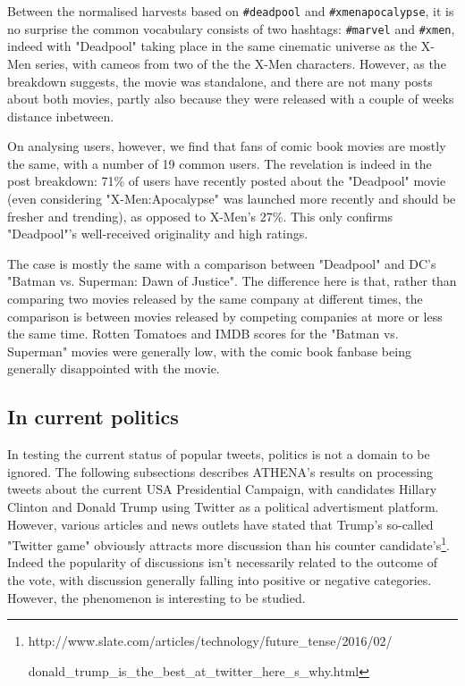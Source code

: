 \documentclass[12pt,a4paper,twoside]{report}
\begin{document}
Between the normalised harvests based on \texttt{\#deadpool} and \texttt{\#xmenapocalypse}, it is no surprise the common vocabulary consists of two hashtags: \texttt{\#marvel} and \texttt{\#xmen}, indeed with "Deadpool" taking place in the same cinematic universe as the X-Men series, with cameos from two of the the X-Men characters. However, as the breakdown suggests, the movie was standalone, and there are not many posts about both movies, partly also because they were released with a couple of weeks distance inbetween.

On analysing users, however, we find that fans of comic book movies are mostly the same, with a number of 19 common users. The revelation is indeed in the post breakdown: 71\% of users have recently posted about the "Deadpool" movie (even considering "X-Men:Apocalypse" was launched more recently and should be fresher and trending), as opposed to X-Men's 27\%. This only confirms "Deadpool"'s well-received originality and high ratings.

The case is mostly the same with a comparison between "Deadpool" and DC's "Batman vs. Superman: Dawn of Justice". The difference here is that, rather than comparing two movies released by the same company at different times, the comparison is between movies released by competing companies at more or less the same time. Rotten Tomatoes and IMDB scores for the "Batman vs. Superman" movies were generally low, with the comic book fanbase being generally disappointed with the movie. 

\subsection{In current politics}
In testing the current status of popular tweets, politics is not a domain to be ignored. The following subsections describes ATHENA's results on processing tweets about the current USA Presidential Campaign, with candidates Hillary Clinton and Donald Trump using Twitter as a political advertisment platform. However, various articles and news outlets have stated that Trump's so-called "Twitter game" obviously attracts more discussion than his counter candidate's\footnote{http://www.slate.com/articles/technology/future\_tense/2016/02/

donald\_trump\_is\_the\_best\_at\_twitter\_here\_s\_why.html}. Indeed the popularity of discussions isn't necessarily related to the outcome of the vote, with discussion generally falling into positive or negative categories. However, the phenomenon is interesting to be studied.
\end{document}
